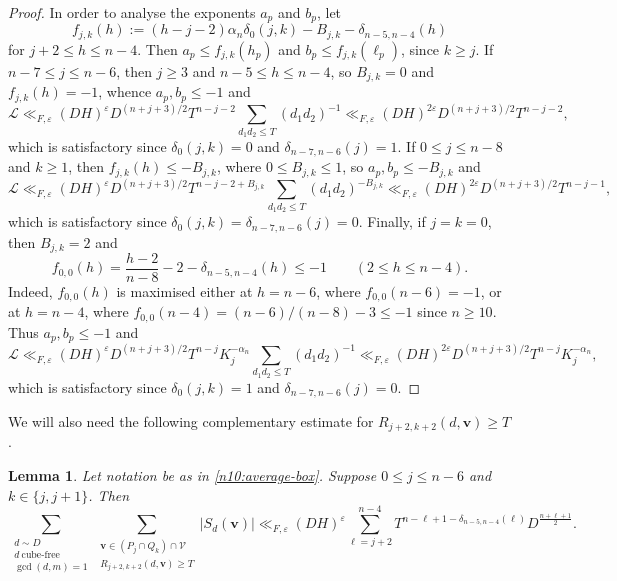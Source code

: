 \documentclass[a4paper,11pt, twoside,reqno]{amsart}
\theoremstyle{plain}
\newtheorem{lemma}[thm]{Lemma}
\theoremstyle{definition}
\theoremstyle{remark}
\newcommand{\bfv}{\bm{v}}
\newcommand{\ve}{\varepsilon}
\renewcommand{\le}{\leqslant}
\renewcommand{\ge}{\geqslant}
\numberwithin{equation}{section}
\begin{document}
\begin{proof}
In order to analyse the exponents $a_p$ and $b_p$, let
$$f_{j,k}(h) := (h-j-2) \alpha_n\delta_0(j,k)
-B_{j,k}
-\delta_{n-5,n-4}(h)$$
for $j+2\le h\le n-4$.
Then $a_p\le f_{j,k}(h_p)$ and $b_p\le f_{j,k}(\ell_p)$, since $k\ge j$.
If $n-7\le j\le n-6$, then $j\ge 3$ and $n-5\le h\le n-4$, so
$B_{j,k}=0$ and $f_{j,k}(h) = -1$, whence $a_p,b_p\le -1$ and
\begin{equation*}
\mathcal L \ll_{F,\ve} (DH)^\ve D^{(n+j+3)/2} T^{n-j-2}
\sum_{d_1d_2\le T} (d_1d_2)^{-1}
\ll_{F,\ve} (DH)^{2\ve} D^{(n+j+3)/2} T^{n-j-2},
\end{equation*}
which is satisfactory since $\delta_0(j,k) = 0$ and $\delta_{n-7,n-6}(j) = 1$.
If $0\le j\le n-8$ and $k\ge 1$, then $f_{j,k}(h) \le -B_{j,k}$,
where $0\le B_{j,k}\le 1$, so $a_p,b_p\le -B_{j,k}$ and
\begin{equation*}
\mathcal L \ll_{F,\ve} (DH)^\ve D^{(n+j+3)/2} T^{n-j-2+B_{j,k}}
\sum_{d_1d_2\le T} (d_1d_2)^{-B_{j,k}}
\ll_{F,\ve} (DH)^{2\ve} D^{(n+j+3)/2} T^{n-j-1},
\end{equation*}
which is satisfactory since $\delta_0(j,k) = \delta_{n-7,n-6}(j) = 0$.
Finally, if $j=k=0$, then $B_{j,k}=2$ and
\[
f_{0,0}(h) = \frac{h-2}{n-8}-2-\delta_{n-5,n-4}(h)\le -1
\qquad(2\le h\le n-4).
\]
Indeed, $f_{0,0}(h)$ is maximised either at $h=n-6$, where $f_{0,0}(n-6) = -1$,
or at $h=n-4$, where $f_{0,0}(n-4) = (n-6)/(n-8) - 3 \le -1$
since $n\ge 10$.
Thus $a_p,b_p\le -1$ and
\begin{equation*}
\mathcal L \ll_{F,\ve} (DH)^\ve D^{(n+j+3)/2} T^{n-j} K_j^{-\alpha_n}
\sum_{d_1d_2\le T} (d_1d_2)^{-1}
\ll_{F,\ve} (DH)^{2\ve} D^{(n+j+3)/2} T^{n-j} K_j^{-\alpha_n},
\end{equation*}
which is satisfactory since $\delta_0(j,k) = 1$ and $\delta_{n-7,n-6}(j) = 0$.
\end{proof}


We will also need the following complementary estimate for $R_{j+2,k+2}(d,\bfv)\ge T$.
\begin{lemma}\label{lem:weight-comp}
Let notation be as in \eqref{n10:average-box}.
Suppose $0\le j\le n-6$ and $k\in \{j,j+1\}$.
Then
\begin{equation}\label{n10:weighted-mean-comp}
\sum_{\substack{
d\sim D\\d\ \mathrm{cube\text{-}free}\\
\gcd(d,m)=1}}
\sum_{\substack{
\bfv\in(P_j\cap Q_k)\cap\mathcal V\\
R_{j+2,k+2}(d,\bfv)\ge T}}
|S_d(\bfv)|\ll_{F,\ve}
(DH)^\ve
\sum_{\ell=j+2}^{n-4}
T^{n-\ell+1-\delta_{n-5,n-4}(\ell)}
D^{\frac{n+\ell+1}{2}}.
\end{equation}
\end{lemma}
\end{document}
